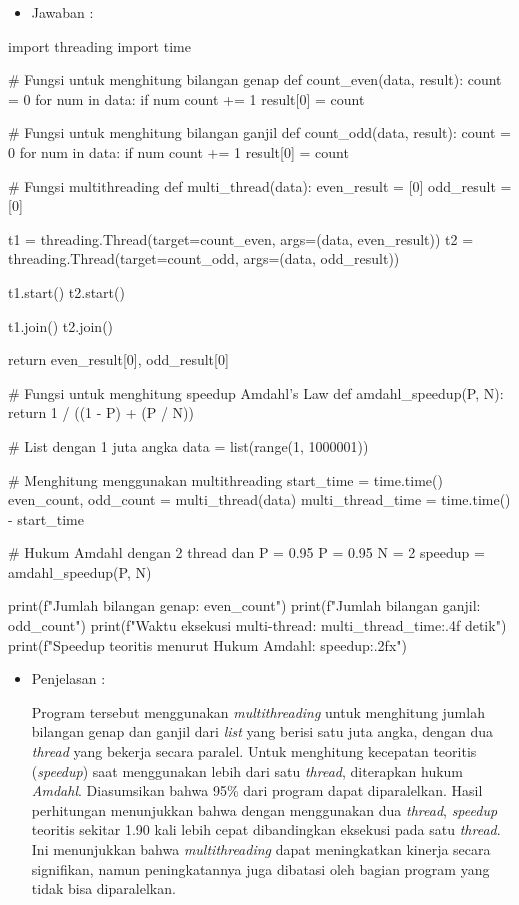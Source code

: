 \documentclass[12pt]{article}
\begin{document}
\begin{itemize}
    \item Jawaban :
\end{itemize}
\begin{python}
import threading
import time

# Fungsi untuk menghitung bilangan genap
def count_even(data, result):
    count = 0
    for num in data:
        if num %
            count += 1
    result[0] = count

# Fungsi untuk menghitung bilangan ganjil
def count_odd(data, result):
    count = 0
    for num in data:
        if num %
            count += 1
    result[0] = count

# Fungsi multithreading
def multi_thread(data):
    even_result = [0]
    odd_result = [0]

    t1 = threading.Thread(target=count_even, args=(data, even_result))
    t2 = threading.Thread(target=count_odd, args=(data, odd_result))

    t1.start()
    t2.start()

    t1.join()
    t2.join()

    return even_result[0], odd_result[0]

# Fungsi untuk menghitung speedup Amdahl's Law
def amdahl_speedup(P, N):
    return 1 / ((1 - P) + (P / N))

# List dengan 1 juta angka
data = list(range(1, 1000001))

# Menghitung menggunakan multithreading
start_time = time.time()
even_count, odd_count = multi_thread(data)
multi_thread_time = time.time() - start_time

# Hukum Amdahl dengan 2 thread dan P = 0.95
P = 0.95
N = 2
speedup = amdahl_speedup(P, N)

print(f"Jumlah bilangan genap: {even_count}")
print(f"Jumlah bilangan ganjil: {odd_count}")
print(f"Waktu eksekusi multi-thread: {multi_thread_time:.4f} detik")
print(f"Speedup teoritis menurut Hukum Amdahl: {speedup:.2f}x")
\end{python}
\begin{itemize}
    \item Penjelasan :

    Program tersebut menggunakan \textit{multithreading} untuk menghitung jumlah bilangan genap dan ganjil dari \textit{list} yang berisi satu juta angka, dengan dua \textit{thread} yang bekerja secara paralel. Untuk menghitung kecepatan teoritis (\textit{speedup}) saat menggunakan lebih dari satu \textit{thread}, diterapkan hukum \textit{Amdahl}. Diasumsikan bahwa 95\% dari program dapat diparalelkan. Hasil perhitungan menunjukkan bahwa dengan menggunakan dua \textit{thread}, \textit{speedup} teoritis sekitar 1.90 kali lebih cepat dibandingkan eksekusi pada satu \textit{thread}. Ini menunjukkan bahwa \textit{multithreading} dapat meningkatkan kinerja secara signifikan, namun peningkatannya juga dibatasi oleh bagian program yang tidak bisa diparalelkan.
\end{itemize}
\end{document}
